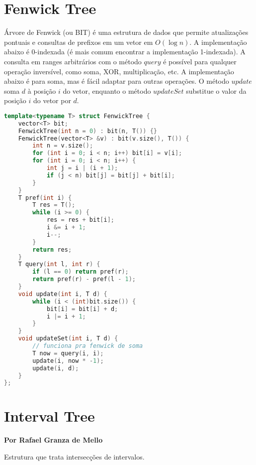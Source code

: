 \documentclass[11pt, a4paper, oneside]{book}
\begin{document}
\hfill

\section{Fenwick Tree}


Árvore de Fenwick (ou BIT) é uma estrutura de dados que permite atualizações pontuais e consultas de prefixos em um vetor em $O(\log n)$. A implementação abaixo é 0-indexada (é mais comum encontrar a implementação 1-indexada). A consulta em ranges arbitrários com o método $query$ é possível para qualquer operação inversível, como soma, XOR, multiplicação, etc. A implementação abaixo é para soma, mas é fácil adaptar para outras operações. O método $update$ soma $d$ à posição $i$ do vetor, enquanto o método $updateSet$ substitue o valor da posição $i$ do vetor por $d$.
\hfill

\begin{multicols}{2}
\begin{lstlisting}[language=C++]
template<typename T> struct FenwickTree {
    vector<T> bit;
    FenwickTree(int n = 0) : bit(n, T()) {}
    FenwickTree(vector<T> &v) : bit(v.size(), T()) {
        int n = v.size();
        for (int i = 0; i < n; i++) bit[i] = v[i];
        for (int i = 0; i < n; i++) {
            int j = i | (i + 1);
            if (j < n) bit[j] = bit[j] + bit[i];
        }
    }
    T pref(int i) {
        T res = T();
        while (i >= 0) {
            res = res + bit[i];
            i &= i + 1;
            i--;
        }
        return res;
    }
    T query(int l, int r) {
        if (l == 0) return pref(r);
        return pref(r) - pref(l - 1);
    }
    void update(int i, T d) {
        while (i < (int)bit.size()) {
            bit[i] = bit[i] + d;
            i |= i + 1;
        }
    }
    void updateSet(int i, T d) {
        // funciona pra fenwick de soma
        T now = query(i, i);
        update(i, now * -1);
        update(i, d);
    }
};
\end{lstlisting}
\end{multicols}

\hfill

\section{Interval Tree}


\textbf{Por Rafael Granza de Mello}



Estrutura que trata intersecções de intervalos.
\end{document}
